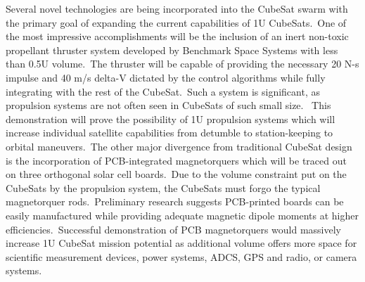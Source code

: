 Several novel technologies are being incorporated into the CubeSat
swarm with the primary goal of expanding the current capabilities of
1U CubeSats. One of the most impressive accomplishments will be the
inclusion of an inert non-toxic propellant thruster system developed
by Benchmark Space Systems with less than 0.5U volume. The thruster
will be capable of providing the necessary 20 N-s impulse and 40 m/s
delta-V dictated by the control algorithms while fully integrating
with the rest of the CubeSat. Such a system is significant, as
propulsion systems are not often seen in CubeSats of such small size. 
This demonstration will prove the possibility of 1U propulsion systems
which will increase individual satellite capabilities from detumble to
station-keeping to orbital maneuvers. The other major divergence from
traditional CubeSat design is the incorporation of PCB-integrated
magnetorquers which will be traced out on three orthogonal solar cell
boards. Due to the volume constraint put on the CubeSats by the
propulsion system, the CubeSats must forgo the typical magnetorquer
rods. Preliminary research suggests PCB-printed boards can be easily
manufactured while providing adequate magnetic dipole moments at
higher efficiencies. Successful demonstration of PCB magnetorquers
would massively increase 1U CubeSat mission potential as additional
volume offers more space for scientific measurement devices, power
systems, ADCS, GPS and radio, or camera systems.

